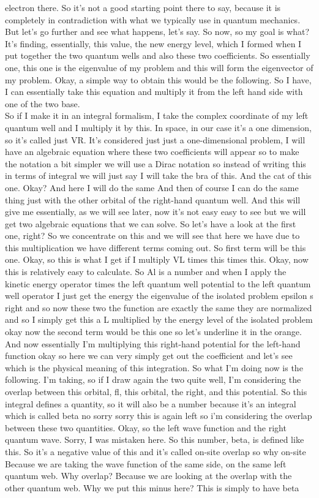 electron there. So it's not a good starting point there to say, because it is completely in contradiction with what we typically use in quantum mechanics. But let's go further and see what happens, let's say. So now, so my goal is what? It's finding, essentially, this value, the new energy level, which I formed when I put together the two quantum wells and also these two coefficients. So essentially one, this one is the eigenvalue of my problem and this will form the eigenvector of my problem. Okay, a simple way to obtain this would be the following. So I have, I can essentially take this equation and multiply it from the left hand side with one of the two base.\\
So if I make it in an integral formalism, I take the complex coordinate of my left quantum well and I multiply it by this. In space, in our case it's a one dimension, so it's called just VR. It's considered just just a one-dimensional problem, I will have an algebraic equation where these two coefficients will appear so to make the notation a bit simpler we will use a Dirac notation so instead of writing this in terms of integral we will just say I will take the bra of this. And the cat of this one. Okay? And here I will do the same And then of course I can do the same thing just with the other orbital of the right-hand quantum well. And this will give me essentially, as we will see later, now it's not easy easy to see but we will get two algebraic equations that we can solve. So let's have a look at the first one, right? So we concentrate on this and we will see that here we have due to this multiplication we have different terms coming out. So first term will be this one. Okay, so this is what I get if I multiply VL times this times this. Okay, now this is relatively easy to calculate. So Al is a number and when I apply the kinetic energy operator times the left quantum well potential to the left quantum well operator I just get the energy the eigenvalue of the isolated problem epsilon s right and so now these two the function are exactly the same they are normalized and so I simply get this a L multiplied by the energy level of the isolated problem okay now the second term would be this one so let's underline it in the orange. And now essentially I'm multiplying this right-hand potential for the left-hand function okay so here we can very simply get out the coefficient and let's see which is the physical meaning of this integration. So what I'm doing now is the following. I'm taking, so if I draw again the two quite well, I'm considering the overlap between this orbital, fl, this orbital, the right, and this potential. So this integral defines a quantity, so it will also be a number because it's an integral which is called beta no sorry sorry this is again left so i'm considering the overlap between these two quantities. Okay, so the left wave function and the right quantum wave. Sorry, I was mistaken here. So this number, beta, is defined like this. So it's a negative value of this and it's called on-site overlap so why on-site Because we are taking the wave function of the same side, on the same left quantum web. Why overlap? Because we are looking at the overlap with the other quantum web. Why we put this minus here? This is simply to have beta 
